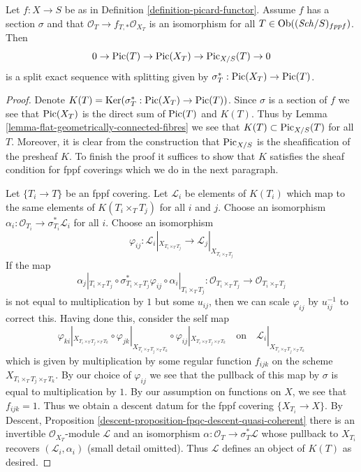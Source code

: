 \begin{lemma}
\label{lemma-flat-geometrically-connected-fibres-with-section}
Let $f : X \to S$ be as in Definition \ref{definition-picard-functor}.
Assume $f$ has a section $\sigma$ and that
$\mathcal{O}_T \to f_{T, *}\mathcal{O}_{X_T}$ is an isomorphism
for all $T \in \mathop{\mathrm{Ob}}\nolimits((\mathit{Sch}/S)_{fppf})$. Then
$$
0 \to \mathop{\mathrm{Pic}}\nolimits(T) \to \mathop{\mathrm{Pic}}\nolimits(X_T) \to \mathrm{Pic}_{X/S}(T) \to 0
$$
is a split exact sequence with splitting given by
$\sigma_T^* : \mathop{\mathrm{Pic}}\nolimits(X_T) \to \mathop{\mathrm{Pic}}\nolimits(T)$.
\end{lemma}

\begin{proof}
Denote $K(T) = \mathop{\mathrm{Ker}}(\sigma_T^* : \mathop{\mathrm{Pic}}\nolimits(X_T) \to \mathop{\mathrm{Pic}}\nolimits(T))$.
Since $\sigma$ is a section of $f$ we see that $\mathop{\mathrm{Pic}}\nolimits(X_T)$ is the direct
sum of $\mathop{\mathrm{Pic}}\nolimits(T)$ and $K(T)$.
Thus by Lemma \ref{lemma-flat-geometrically-connected-fibres} we see that
$K(T) \subset \mathrm{Pic}_{X/S}(T)$ for all $T$. Moreover, it is clear
from the construction that $\mathrm{Pic}_{X/S}$ is the sheafification
of the presheaf $K$. To finish the proof it suffices to show that
$K$ satisfies the sheaf condition for fppf coverings which we do
in the next paragraph.

\medskip\noindent
Let $\{T_i \to T\}$ be an fppf covering. Let $\mathcal{L}_i$ be
elements of $K(T_i)$ which map to the same elements of $K(T_i \times_T T_j)$
for all $i$ and $j$. Choose an isomorphism
$\alpha_i : \mathcal{O}_{T_i} \to \sigma_{T_i}^*\mathcal{L}_i$
for all $i$. Choose an isomorphism
$$
\varphi_{ij} :
\mathcal{L}_i|_{X_{T_i \times_T T_j}}
\longrightarrow
\mathcal{L}_j|_{X_{T_i \times_T T_j}}
$$
If the map
$$
\alpha_j|_{T_i \times_T T_j} \circ
\sigma_{T_i \times_T T_j}^*\varphi_{ij} \circ
\alpha_i|_{T_i \times_T T_j} :
\mathcal{O}_{T_i \times_T T_j} \to \mathcal{O}_{T_i \times_T T_j}
$$
is not equal to multiplication by $1$ but some $u_{ij}$, then we can scale
$\varphi_{ij}$ by $u_{ij}^{-1}$ to correct this. Having done this, consider
the self map
$$
\varphi_{ki}|_{X_{T_i \times_T T_j \times_T T_k}} \circ
\varphi_{jk}|_{X_{T_i \times_T T_j \times_T T_k}} \circ
\varphi_{ij}|_{X_{T_i \times_T T_j \times_T T_k}}
\quad\text{on}\quad
\mathcal{L}_i|_{X_{T_i \times_T T_j \times_T T_k}}
$$
which is given by multiplication by some regular function $f_{ijk}$
on the scheme $X_{T_i \times_T T_j \times_T T_k}$.
By our choice of $\varphi_{ij}$ we see that the pullback of
this map by $\sigma$ is equal to multiplication by $1$. By
our assumption on functions on $X$, we see that $f_{ijk} = 1$.
Thus we obtain a descent datum for the fppf covering
$\{X_{T_i} \to X\}$. By
Descent, Proposition \ref{descent-proposition-fpqc-descent-quasi-coherent}
there is an invertible $\mathcal{O}_{X_T}$-module $\mathcal{L}$
and an isomorphism $\alpha : \mathcal{O}_T \to \sigma_T^*\mathcal{L}$
whose pullback to $X_{T_i}$ recovers $(\mathcal{L}_i, \alpha_i)$
(small detail omitted). Thus $\mathcal{L}$ defines an object
of $K(T)$ as desired.
\end{proof}



